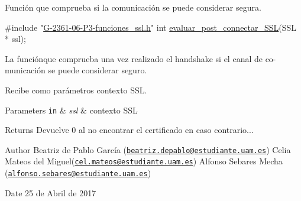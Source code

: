 Función que comprueba si la comunicación se puede considerar segura.


\begin{DoxyCode}
\textcolor{preprocessor}{#include "\hyperlink{_g-2361-06-_p3-funciones__ssl_8h}{G-2361-06-P3-funciones\_ssl.h}"}
\textcolor{keywordtype}{int} \hyperlink{_g-2361-06-_p3-funciones__ssl_8h_ac5f32cf09e3c0efd5cbc25452ed192a9}{evaluar\_post\_connectar\_SSL}(SSL * ssl);
\end{DoxyCode}


La funciónque comprueba una vez realizado el handshake si el canal de co-\/ municación se puede considerar seguro.

Recibe como parámetros contexto S\+SL.


\begin{DoxyParams}[1]{Parameters}
\mbox{\tt in}  & {\em ssl} & contexto S\+SL\\
\hline
\end{DoxyParams}
\begin{DoxyReturn}{Returns}
Devuelve 0 al no encontrar el certificado en caso contrario...
\end{DoxyReturn}
\begin{DoxyAuthor}{Author}
Beatriz de Pablo García (\href{mailto:beatriz.depablo@estudiante.uam.es}{\tt beatriz.\+depablo@estudiante.\+uam.\+es}) Celia Mateos del Miguel(\href{mailto:cel.mateos@estudiante.uam.es}{\tt cel.\+mateos@estudiante.\+uam.\+es}) Alfonso Sebares Mecha (\href{mailto:alfonso.sebares@estudiante.uam.es}{\tt alfonso.\+sebares@estudiante.\+uam.\+es})
\end{DoxyAuthor}
\begin{DoxyDate}{Date}
25 de Abril de 2017
\end{DoxyDate}


 